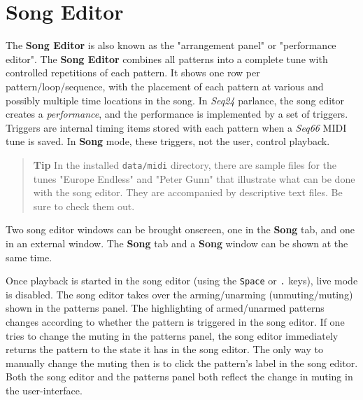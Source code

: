 %
%
%

\section{Song Editor}
\label{sec:song_editor}

   The \textbf{Song Editor}
   is also known as the "arrangement panel" or "performance editor".
   The \textbf{Song Editor} combines all patterns
   into a complete tune with controlled repetitions of each pattern.
   It shows one row per pattern/loop/sequence,
   with the placement of each pattern at various and possibly
   multiple time locations in the song.
   In \textsl{Seq24} parlance, the song editor creates a
   \textsl{performance}, and the performance is implemented by a set of
   triggers.
   Triggers are internal timing items stored with each pattern when a
   \textsl{Seq66} MIDI tune is saved.
   In \textbf{Song} mode, these triggers, not the user, control
   playback.

   \begin{quotation}
      \textbf{Tip}
      In the installed \texttt{data/midi} directory, there are sample files for
      the tunes "Europe Endless" and "Peter Gunn" that illustrate what can be
      done with the song editor.  They are accompanied by descriptive text
      files.  Be sure to check them out.
   \end{quotation}

   Two song editor windows can be
   brought onscreen, one in the \textbf{Song} tab, and
   one in an external window.
   The \textbf{Song} tab and a \textbf{Song} window can be shown at the
   same time.


   Once playback is started in the song editor (using the \texttt{Space} or
   \texttt{.} keys), live mode is disabled.
   The song editor takes over the arming/unarming (unmuting/muting)
   shown in the patterns panel.  The highlighting of armed/unarmed patterns
   changes according to whether the pattern is triggered in the song editor.
   If one tries to change the muting in
   the patterns panel, the song editor immediately returns the pattern to the
   state it has in the song editor.  The only way to manually change the muting
   then is to click the pattern's label in the song editor.
   Both the song editor and the patterns panel both reflect the change in
   muting in the user-interface.

